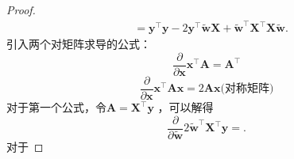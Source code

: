 \begin{proof}
\begin{align*}
        &= \bm{y}^\top \bm{y} -2\bm{y}^\top \bm{\widetilde{w}}\bm{X} + \bm{\widetilde{w}}^\top \bm{X}^\top \bm{X} \bm{\widetilde{w}}
    .\end{align*}
    引入两个对矩阵求导的公式：\begin{equation}
        \label{eq:xTAAT}
        \frac{\partial }{\partial \bm{x}}\bm{x}^\top \bm{A} = \bm{A}^\top
    \end{equation}
    \begin{equation}
        \label{eq:xTAx2Ax}
        \frac{\partial }{\partial \bm{x}} \bm{x}^\top \bm{Ax} = 2\bm{Ax} \text{(对称矩阵)}
    \end{equation}
    对于第一个公式，令$\bm{A}=\bm{X}^\top \bm{y}$ ，可以解得\[
        \frac{\partial }{\partial \bm{\widetilde{w}}} 2\bm{\widetilde{w}}^\top \bm{X}^\top \bm{y} = 
    .\]对于
\end{proof}
